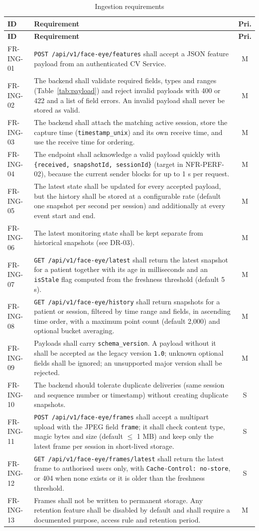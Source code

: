 \documentclass[a4paper,11pt]{scrreprt}
\makeatletter
\newenvironment{reqtable}[1]{%
  \small
  \begin{longtable}{@{}>{\ttfamily\footnotesize}p{2.55cm}>{\raggedright\arraybackslash}p{10.7cm}c@{}}
  \caption{#1}\\
  \toprule \textbf{ID} & \textbf{Requirement} & \textbf{Pri.}\\ \midrule
  \endfirsthead
  \toprule \textbf{ID} & \textbf{Requirement} & \textbf{Pri.}\\ \midrule
  \endhead
  \bottomrule
  \endfoot
}{%
  \end{longtable}\normalsize
}
\newcommand{\req}[3]{#1 & #2 & #3 \\ \midrule}
\newcommand{\code}[1]{\texttt{#1}}
\makeatother
\begin{document}
\begin{reqtable}{Ingestion requirements}
\req{FR-ING-01}{\code{POST /api/v1/face-eye/features} shall accept a JSON feature payload from an authenticated CV Service.}{M}
\req{FR-ING-02}{The backend shall validate required fields, types and ranges (Table~\ref{tab:payload}) and reject invalid payloads with 400 or 422 and a list of field errors. An invalid payload shall never be stored as valid.}{M}
\req{FR-ING-03}{The backend shall attach the matching active session, store the capture time (\code{timestamp_unix}) and its own receive time, and use the receive time for ordering.}{M}
\req{FR-ING-04}{The endpoint shall acknowledge a valid payload quickly with \code{\{received, snapshotId, sessionId\}} (target in NFR-PERF-02), because the current sender blocks for up to 1 s per request.}{M}
\req{FR-ING-05}{The latest state shall be updated for every accepted payload, but the history shall be stored at a configurable rate (default one snapshot per second per session) and additionally at every event start and end.}{M}
\req{FR-ING-06}{The latest monitoring state shall be kept separate from historical snapshots (see DR-03).}{M}
\req{FR-ING-07}{\code{GET /api/v1/face-eye/latest} shall return the latest snapshot for a patient together with its age in milliseconds and an \code{isStale} flag computed from the freshness threshold (default 5 s).}{M}
\req{FR-ING-08}{\code{GET /api/v1/face-eye/history} shall return snapshots for a patient or session, filtered by time range and fields, in ascending time order, with a maximum point count (default 2,000) and optional bucket averaging.}{M}
\req{FR-ING-09}{Payloads shall carry \code{schema_version}. A payload without it shall be accepted as the legacy version \code{1.0}; unknown optional fields shall be ignored; an unsupported major version shall be rejected.}{M}
\req{FR-ING-10}{The backend should tolerate duplicate deliveries (same session and sequence number or timestamp) without creating duplicate snapshots.}{S}
\req{FR-ING-11}{\code{POST /api/v1/face-eye/frames} shall accept a multipart upload with the JPEG field \code{frame}; it shall check content type, magic bytes and size (default $\le$ 1 MB) and keep only the latest frame per session in short-lived storage.}{S}
\req{FR-ING-12}{\code{GET /api/v1/face-eye/frames/latest} shall return the latest frame to authorised users only, with \code{Cache-Control: no-store}, or 404 when none exists or it is older than the freshness threshold.}{S}
\req{FR-ING-13}{Frames shall not be written to permanent storage. Any retention feature shall be disabled by default and shall require a documented purpose, access rule and retention period.}{M}

\end{reqtable}
\end{document}
